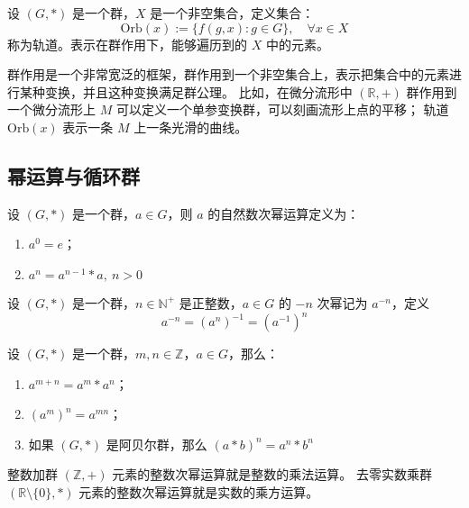 \begin{definition}[轨道 Orbit]
    设 $(G, *)$ 是一个群，$X$ 是一个非空集合，定义集合：
    \[
        \mathrm{Orb}(x) := \{f(g,x):g\in G\},\quad \forall x\in X
    \]
    称为轨道。表示在群作用下，能够遍历到的 $X$ 中的元素。
\end{definition}

\begin{note}
    群作用是一个非常宽泛的框架，群作用到一个非空集合上，表示把集合中的元素进行某种变换，并且这种变换满足群公理。
    比如，在微分流形中 $(\mathbb{R},+)$ 群作用到一个微分流形上 $M$ 可以定义一个单参变换群，可以刻画流形上点的平移；
    轨道 $\mathrm{Orb}(x)$ 表示一条 $M$ 上一条光滑的曲线。
\end{note}

\vspace{1em}
\subsection{幂运算与循环群}
\begin{definition}[群元素的自然数次幂运算]
    设 $(G, *)$ 是一个群，$a\in G$，则 $a$ 的自然数次幂运算定义为：
    \begin{enumerate}
        \item $a^0 = e$；
        \item $a^n = a^{n-1} * a,\ n > 0$
    \end{enumerate}
\end{definition}

\begin{definition}[群元素的负整数次幂运算]
    设 $(G, *)$ 是一个群，$n\in\mathbb{N}^+$ 是正整数，$a\in G$ 的 $-n$ 次幂记为 $a^{-n}$，定义
    \[
        a^{-n} = (a^n)^{-1} = (a^{-1})^n
    \]
\end{definition}

\begin{proposition}[群元素的整数次幂运算的性质]
    设 $(G, *)$ 是一个群，$m, n\in\mathbb{Z}$，$a\in G$，那么：
    \begin{enumerate}
        \item $a^{m+n} = a^m * a^n$；
        \item $(a^m)^n = a^{mn}$；
        \item 如果 $(G, *)$ 是阿贝尔群，那么 $(a * b)^n = a^n * b^n$
    \end{enumerate}
\end{proposition}

\begin{note}
    整数加群 $(\mathbb{Z}, +)$ 元素的整数次幂运算就是整数的乘法运算。
    去零实数乘群 $(\mathbb{R}\setminus\{0\}, *)$ 元素的整数次幂运算就是实数的乘方运算。
\end{note}
\vspace{1em}


